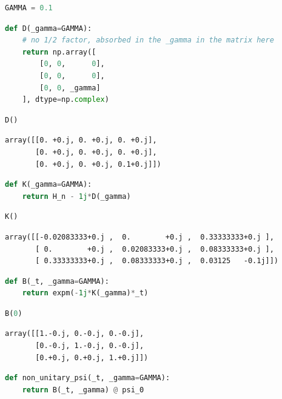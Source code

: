 \begin{lstlisting}[language=Python]
GAMMA = 0.1
\end{lstlisting}

\begin{lstlisting}[language=Python]
def D(_gamma=GAMMA):
    # no 1/2 factor, absorbed in the _gamma in the matrix here
    return np.array([
        [0, 0,      0],
        [0, 0,      0],
        [0, 0, _gamma]
    ], dtype=np.complex)
\end{lstlisting}

\begin{lstlisting}[language=Python]
D()
\end{lstlisting}

\begin{lstlisting}
array([[0. +0.j, 0. +0.j, 0. +0.j],
       [0. +0.j, 0. +0.j, 0. +0.j],
       [0. +0.j, 0. +0.j, 0.1+0.j]])
\end{lstlisting}

\begin{lstlisting}[language=Python]
def K(_gamma=GAMMA):
    return H_n - 1j*D(_gamma)
\end{lstlisting}

\begin{lstlisting}[language=Python]
K()
\end{lstlisting}

\begin{lstlisting}
array([[-0.02083333+0.j ,  0.        +0.j ,  0.33333333+0.j ],
       [ 0.        +0.j ,  0.02083333+0.j ,  0.08333333+0.j ],
       [ 0.33333333+0.j ,  0.08333333+0.j ,  0.03125   -0.1j]])
\end{lstlisting}

\begin{lstlisting}[language=Python]
def B(_t, _gamma=GAMMA):
    return expm(-1j*K(_gamma)*_t)
\end{lstlisting}

\begin{lstlisting}[language=Python]
B(0)
\end{lstlisting}

\begin{lstlisting}
array([[1.-0.j, 0.-0.j, 0.-0.j],
       [0.-0.j, 1.-0.j, 0.-0.j],
       [0.+0.j, 0.+0.j, 1.+0.j]])
\end{lstlisting}

\begin{lstlisting}[language=Python]
def non_unitary_psi(_t, _gamma=GAMMA):
    return B(_t, _gamma) @ psi_0
\end{lstlisting}

